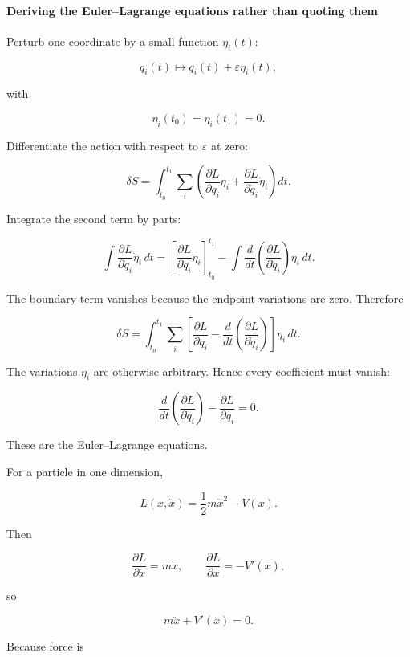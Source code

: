 \paragraph{Deriving the Euler--Lagrange equations rather than quoting them}\label{02-foundations-ii-ch025-deriving-the-eulerlagrange-equations-rather-than-quoting-them}

\hypertarget{02-foundations-ii-ch025-deriving-the-eulerlagrange-equations-rather-than-quoting-them}{}

Perturb one coordinate by a small function \(\eta_i(t)\):

\[
q_i(t)\mapsto q_i(t)+\varepsilon\eta_i(t),
\]

with

\[
\eta_i(t_0)=\eta_i(t_1)=0.
\]

Differentiate the action with respect to \(\varepsilon\) at zero:

\[
\delta S
=
\int_{t_0}^{t_1}
\sum_i
\left(
\frac{\partial L}{\partial q_i}\eta_i
+
\frac{\partial L}{\partial \dot q_i}\dot\eta_i
\right)
dt.
\]

Integrate the second term by parts:

\[
\int
\frac{\partial L}{\partial\dot q_i}
\dot\eta_i\,dt
=
\left[
\frac{\partial L}{\partial\dot q_i}\eta_i
\right]_{t_0}^{t_1}
-
\int
\frac{d}{dt}
\left(
\frac{\partial L}{\partial\dot q_i}
\right)\eta_i\,dt.
\]

The boundary term vanishes because the endpoint variations are zero. Therefore

\[
\delta S
=
\int_{t_0}^{t_1}
\sum_i
\left[
\frac{\partial L}{\partial q_i}
-
\frac{d}{dt}
\left(
\frac{\partial L}{\partial\dot q_i}
\right)
\right]
\eta_i\,dt.
\]

The variations \(\eta_i\) are otherwise arbitrary. Hence every coefficient must vanish:

\[
\boxed{
\frac{d}{dt}
\left(
\frac{\partial L}{\partial\dot q_i}
\right)
-
\frac{\partial L}{\partial q_i}
=
0
}.
\]

These are the Euler--Lagrange equations.

For a particle in one dimension,

\[
L(x,\dot x)=\frac12m\dot x^2-V(x).
\]

Then

\[
\frac{\partial L}{\partial\dot x}=m\dot x,
\qquad
\frac{\partial L}{\partial x}=-V'(x),
\]

so

\[
m\ddot x+V'(x)=0.
\]

Because force is

